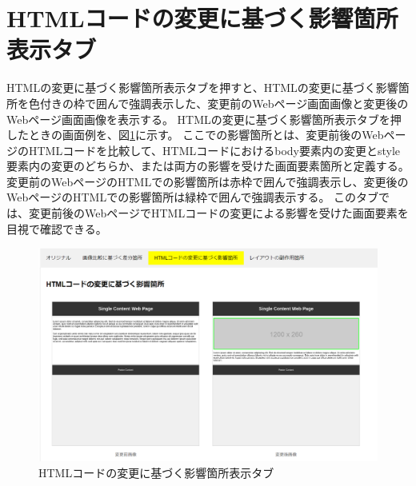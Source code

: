 \section{HTMLコードの変更に基づく影響箇所表示タブ}\label{subsec:html_tab}
HTMLの変更に基づく影響箇所表示タブを押すと、HTMLの変更に基づく影響箇所を色付きの枠で囲んで強調表示した、変更前のWebページ画面画像と変更後のWebページ画面画像を表示する。
HTMLの変更に基づく影響箇所表示タブを押したときの画面例を、図\ref{fig: Appearance_html_tab}に示す。
ここでの影響箇所とは、変更前後のWebページのHTMLコードを比較して、HTMLコードにおけるbody要素内の変更とstyle要素内の変更のどちらか、または両方の影響を受けた画面要素箇所と定義する。
変更前のWebページのHTMLでの影響箇所は赤枠で囲んで強調表示し、変更後のWebページのHTMLでの影響箇所は緑枠で囲んで強調表示する。
このタブでは、変更前後のWebページでHTMLコードの変更による影響を受けた画面要素を目視で確認できる。
\begin{figure}[tp]
    \begin{center}
        \includegraphics[width=1.0\columnwidth]{image/3_html_tab.png}
        \caption{HTMLコードの変更に基づく影響箇所表示タブ}
        \label{fig: Appearance_html_tab}
    \end{center}
\end{figure}



